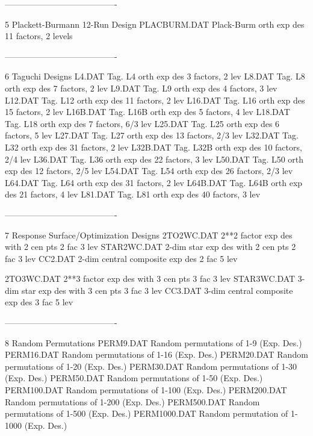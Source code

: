 ----------------------------------------
 
5
Plackett-Burmann 12-Run Design
      PLACBURM.DAT  Plack-Burm orth exp des 11 factors, 2 levels
 
----------------------------------------
 
6
Taguchi Designs
      L4.DAT        Tag. L4   orth exp des  3 factors,   2 lev
      L8.DAT        Tag. L8   orth exp des  7 factors,   2 lev
      L9.DAT        Tag. L9   orth exp des  4 factors,   3 lev
      L12.DAT       Tag. L12  orth exp des 11 factors,   2 lev
      L16.DAT       Tag. L16  orth exp des 15 factors,   2 lev
      L16B.DAT      Tag. L16B orth exp des  5 factors,   4 lev
      L18.DAT       Tag. L18  orth exp des  7 factors, 6/3 lev
      L25.DAT       Tag. L25  orth exp des  6 factors,   5 lev
      L27.DAT       Tag. L27  orth exp des 13 factors, 2/3 lev
      L32.DAT       Tag. L32  orth exp des 31 factors,   2 lev
      L32B.DAT      Tag. L32B orth exp des 10 factors, 2/4 lev
      L36.DAT       Tag. L36  orth exp des 22 factors,   3 lev
      L50.DAT       Tag. L50  orth exp des 12 factors, 2/5 lev
      L54.DAT       Tag. L54  orth exp des 26 factors, 2/3 lev
      L64.DAT       Tag. L64  orth exp des 31 factors,   2 lev
      L64B.DAT      Tag. L64B orth exp des 21 factors,   4 lev
      L81.DAT       Tag. L81  orth exp des 40 factors,   3 lev
 
----------------------------------------
 
7
Response Surface/Optimization Designs
      2TO2WC.DAT    2**2 factor exp des with 2 cen pts 2 fac 3 lev
      STAR2WC.DAT   2-dim star exp des  with 2 cen pts 2 fac 3 lev
      CC2.DAT       2-dim central composite exp des    2 fac 5 lev
 
      2TO3WC.DAT    2**3 factor exp des with 3 cen pts 3 fac 3 lev
      STAR3WC.DAT   3-dim star exp des  with 3 cen pts 3 fac 3 lev
      CC3.DAT       3-dim central composite exp des    3 fac 5 lev
 
----------------------------------------
 
8
Random Permutations
      PERM9.DAT     Random permutations of 1-9    (Exp. Des.)
      PERM16.DAT    Random permutations of 1-16   (Exp. Des.)
      PERM20.DAT    Random permutations of 1-20   (Exp. Des.)
      PERM30.DAT    Random permutations of 1-30   (Exp. Des.)
      PERM50.DAT    Random permutations of 1-50   (Exp. Des.)
      PERM100.DAT   Random permutations of 1-100  (Exp. Des.)
      PERM200.DAT   Random permutations of 1-200  (Exp. Des.)
      PERM500.DAT   Random permutations of 1-500  (Exp. Des.)
      PERM1000.DAT  Random permutation  of 1-1000 (Exp. Des.)
 
